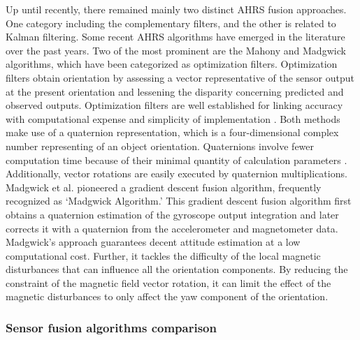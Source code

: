 Up until recently, there remained mainly two distinct AHRS fusion approaches. One category including the complementary filters, and the other is related to Kalman filtering. Some recent AHRS algorithms have emerged in the literature over the past years. Two of the most prominent are the Mahony and Madgwick algorithms, which have been categorized as optimization filters. Optimization filters obtain orientation by assessing a vector representative of the sensor output at the present orientation and lessening the disparity concerning predicted and observed outputs. Optimization filters are well established for linking accuracy with computational expense and simplicity of implementation \cite{madgwick2020extended}.
Both methods make use of a quaternion representation, which is a four-dimensional complex number representing of an object orientation. Quaternions involve fewer computation time because of their minimal quantity of calculation parameters \cite{ludwig2018comparison}. Additionally, vector rotations are easily executed by quaternion multiplications.
Madgwick et al. \cite{madgwick2010efficient} pioneered a gradient descent fusion algorithm, frequently recognized as ‘Madgwick Algorithm.' This gradient descent fusion algorithm first obtains a quaternion estimation of the gyroscope output integration and later corrects it with a quaternion from the accelerometer and magnetometer data. Madgwick's approach guarantees decent attitude estimation at a low computational cost. Further, it tackles the difficulty of the local magnetic disturbances that can influence all the orientation components. By reducing the constraint of the magnetic field vector rotation, it can limit the effect of the magnetic disturbances to only affect the yaw component of the orientation.

\subsubsection{Sensor fusion algorithms comparison}

